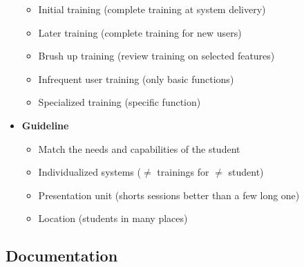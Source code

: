 \begin{itemize}
\begin{itemize}
    \item Initial training (complete training at system delivery)
    \item Later training (complete training for new users)
    \item Brush up training (review training on selected features)
    \item Infrequent user training (only basic functions)
    \item Specialized training (specific function)
\end{itemize}

\item \textbf{Guideline}
    \begin{itemize}
        \item Match the needs and capabilities of the student
        \item Individualized systems ($\neq$ trainings for
            $\neq$ student)
        \item Presentation unit (shorts sessions better than a
            few long one)
            \item Location (students in many places)
    \end{itemize}
\end{itemize}

\subsection{Documentation}


